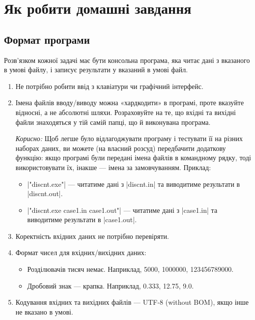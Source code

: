 \documentclass[12pt,a4paper]{article}
\begin{document}
\section*{Як робити домашні завдання}


\subsection*{Формат програми}

Розв'язком кожної задачі має бути консольна програма, яка читає дані з вказаного в умові файлу, і записує результати у вказаний в умові файл.

\begin{enumerate}
    \item Не потрібно робити ввід з клавіатури чи графічний інтерфейс.
    \item Імена файлів вводу/виводу можна «хардкодити» в програмі, проте вказуйте відносні, а не абсолютні шляхи. Розраховуйте на те, що вхідні та вихідні файли знаходяться у тій самій папці, що й виконувана програма.

        \vspace{0.5em}
        \emph{Корисно:} Щоб легше було відлагоджувати програму і тестувати її на різних наборах даних, ви можете (на власний розсуд) передбачити додаткову функцію: якщо програмі були передані імена файлів в командному рядку, тоді використовувати їх, інакше --- імена за замовчуванням. Приклад:
        \begin{itemize}
            \item |"discnt.exe"| --- читатиме дані з |discnt.in| та виводитиме результати в |discnt.out|.
            \item |"discnt.exe case1.in case1.out"| --- читатиме дані з |case1.in| та виводитиме результати в |case1.out|.
        \end{itemize}

    \item Коректність вхідних даних не потрібно перевіряти.
    \item Формат чисел для вхідних/вихідних даних:
        \begin{itemize}
            \item Розділювачів тисяч немає. Наприклад, 5000, 1000000, 123456789000.
            \item Дробовий знак --- крапка. Наприклад, 0.333, 12.75, 9.0.
        \end{itemize}

    \item Кодування вхідних та вихідних файлів --- UTF-8 (without BOM), якщо інше не вказано в умові.
\end{enumerate}
\end{document}
